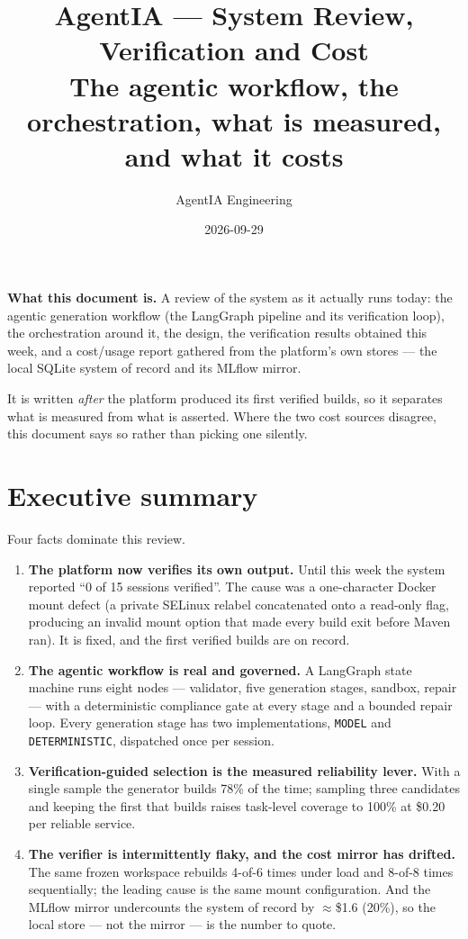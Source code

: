 \documentclass[11pt,a4paper]{article}
\title{\vspace{-1.4cm}\textbf{AgentIA --- System Review, Verification and Cost}\\[0.25cm]
\large The agentic workflow, the orchestration, what is measured, and what it costs}
\author{AgentIA Engineering}
\date{2026-09-29}
\begin{document}
\maketitle
\thispagestyle{fancy}

\begin{notebox}
\textbf{What this document is.} A review of the system as it actually runs today:
the agentic generation workflow (the LangGraph pipeline and its verification loop),
the orchestration around it, the design, the verification results obtained this
week, and a cost/usage report gathered from the platform's own stores --- the local
SQLite system of record and its MLflow mirror.

It is written \emph{after} the platform produced its first verified builds, so it
separates what is measured from what is asserted. Where the two cost sources
disagree, this document says so rather than picking one silently.
\end{notebox}

\tableofcontents
\vspace{0.4cm}

\section{Executive summary}

Four facts dominate this review.

\begin{enumerate}[leftmargin=1.4em]
  \item \textbf{The platform now verifies its own output.} Until this week the
  system reported ``0 of 15 sessions verified''. The cause was a one-character
  Docker mount defect (a private SELinux relabel concatenated onto a read-only
  flag, producing an invalid mount option that made every build exit before Maven
  ran). It is fixed, and the first verified builds are on record.
  \item \textbf{The agentic workflow is real and governed.} A LangGraph state
  machine runs eight nodes --- validator, five generation stages, sandbox, repair
  --- with a deterministic compliance gate at every stage and a bounded repair
  loop. Every generation stage has two implementations, \texttt{MODEL} and
  \texttt{DETERMINISTIC}, dispatched once per session.
  \item \textbf{Verification-guided selection is the measured reliability lever.}
  With a single sample the generator builds 78\% of the time; sampling three
  candidates and keeping the first that builds raises task-level coverage to 100\%
  at \$0.20 per reliable service.
  \item \textbf{The verifier is intermittently flaky, and the cost mirror has
  drifted.} The same frozen workspace rebuilds 4-of-6 times under load and 8-of-8
  times sequentially; the leading cause is the same mount configuration. And the
  MLflow mirror undercounts the system of record by $\approx$\$1.6 (20\%), so the local
  store --- not the mirror --- is the number to quote.
\end{enumerate}
\end{document}
